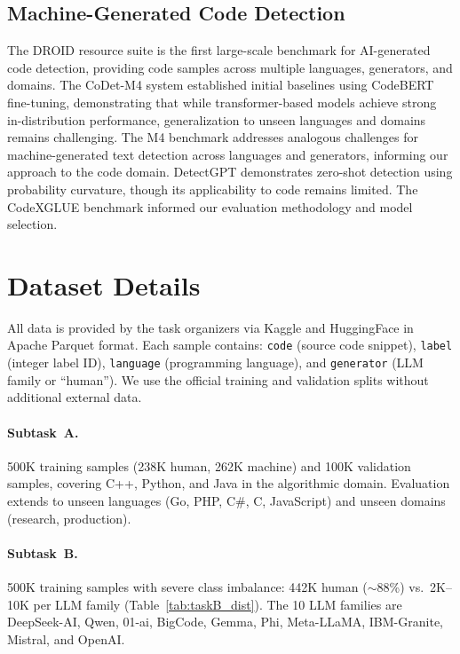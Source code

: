 \documentclass[11pt]{article}
\begin{document}
\subsection{Machine-Generated Code Detection}

The DROID resource suite \cite{orel2025droid} is the first large-scale benchmark for AI-generated code detection, providing code samples across multiple languages, generators, and domains. The CoDet-M4 system \cite{orel-etal-2025-codet} established initial baselines using CodeBERT fine-tuning, demonstrating that while transformer-based models achieve strong in-distribution performance, generalization to unseen languages and domains remains challenging. The M4 benchmark \cite{wang-etal-2024-m4} addresses analogous challenges for machine-generated text detection across languages and generators, informing our approach to the code domain. DetectGPT \cite{mitchell2023detectgpt} demonstrates zero-shot detection using probability curvature, though its applicability to code remains limited. The CodeXGLUE benchmark \cite{lu2021codexglue} informed our evaluation methodology and model selection.

\section{Dataset Details}
\label{sec:datasets}

All data is provided by the task organizers via Kaggle and HuggingFace in Apache Parquet format. Each sample contains: \texttt{code} (source code snippet), \texttt{label} (integer label ID), \texttt{language} (programming language), and \texttt{generator} (LLM family or ``human''). We use the official training and validation splits without additional external data.

\paragraph{Subtask~A.} 500K training samples (238K human, 262K machine) and 100K validation samples, covering C++, Python, and Java in the algorithmic domain. Evaluation extends to unseen languages (Go, PHP, C\#, C, JavaScript) and unseen domains (research, production).

\paragraph{Subtask~B.} 500K training samples with severe class imbalance: 442K human ($\sim$88\%) vs.\ 2K--10K per LLM family (Table~\ref{tab:taskB_dist}). The 10 LLM families are DeepSeek-AI, Qwen, 01-ai, BigCode, Gemma, Phi, Meta-LLaMA, IBM-Granite, Mistral, and OpenAI.
\end{document}
